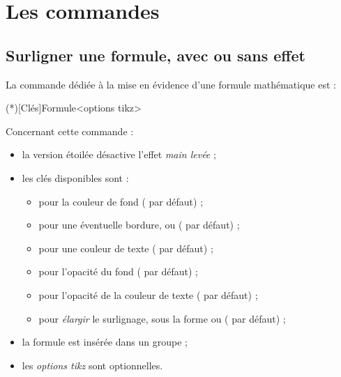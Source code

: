 \documentclass[french,11pt,a4paper]{article}
\begin{document}
%

\pagebreak

\section{Les commandes}

\subsection{Surligner une formule, avec  ou sans effet}

La commande dédiée à la mise en évidence d'une formule mathématique est  :

\begin{codehigh}[language=latex/latex2,style/main=cyan!10,style/code=cyan!10]
\SurlignerFormule(*)[Clés]{Formule}<options tikz>
\end{codehigh}

Concernant cette commande :

\begin{itemize}
	\item la version étoilée désactive l'effet \textit{main levée} ;
	\item les clés disponibles sont :
	\begin{itemize}
		\item {} pour la couleur de fond ( par défaut) ;
		\item {} pour une éventuelle bordure,  ou  ( par défaut) ;
		\item {} pour une couleur de texte ( par défaut) ;
		\item {} pour l'opacité du fond ( par défaut) ;
		\item {} pour l'opacité de la couleur de texte ( par défaut) ;
		\item {} pour \textit{élargir} le surlignage, sous la forme  ou  (\MontreCode{1pt/2pt} par défaut) ;
	\end{itemize}
	\item la formule est insérée dans un groupe  ;
	\item les \textit{options tikz} sont optionnelles.
\end{itemize}
\end{document}
